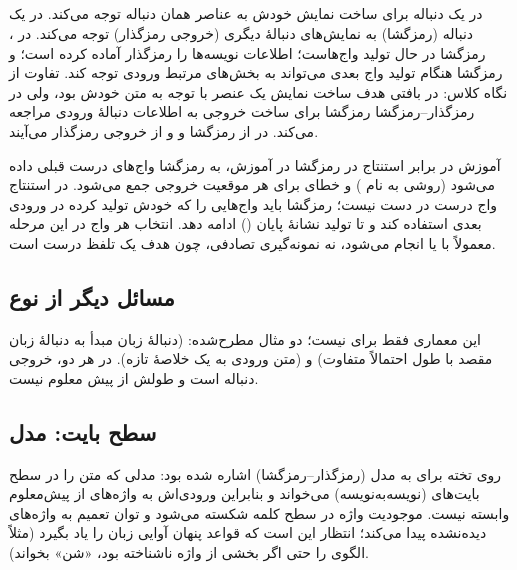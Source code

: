 \subsection{}
در  یک دنباله برای ساخت نمایش خودش به عناصر همان دنباله توجه می‌کند. در  یک دنباله (رمزگشا) به نمایش‌های دنبالهٔ دیگری (خروجی رمزگذار) توجه می‌کند. در ، رمزگشا در حال تولید واج‌هاست؛ اطلاعات نویسه‌ها را رمزگذار آماده کرده است؛ و رمزگشا هنگام تولید واج بعدی می‌تواند به بخش‌های مرتبط ورودی توجه کند. تفاوت از نگاه کلاس: در  بافتی هدف ساخت نمایش یک عنصر با توجه به متن خودش بود، ولی در رمزگذار–رمزگشا رمزگشا برای ساخت خروجی به اطلاعات دنبالهٔ ورودی مراجعه می‌کند. در   از رمزگشا و  و  از خروجی رمزگذار می‌آیند.

\begin{addedbox}{آموزش در برابر استنتاج در رمزگشا}
در آموزش، به رمزگشا واج‌های درست قبلی داده می‌شود (روشی به نام ) و خطای  برای هر موقعیت خروجی جمع می‌شود. در استنتاج واج درست در دست نیست؛ رمزگشا باید واج‌هایی را که خودش تولید کرده در ورودی بعدی استفاده کند و تا تولید نشانهٔ پایان () ادامه دهد. انتخاب هر واج در این مرحله معمولاً با  یا  انجام می‌شود، نه نمونه‌گیری تصادفی، چون هدف یک تلفظ درست است.
\end{addedbox}

\subsection{مسائل دیگر از نوع }
این معماری فقط برای  نیست؛ دو مثال مطرح‌شده:  (دنبالهٔ زبان مبدأ به دنبالهٔ زبان مقصد با طول احتمالاً متفاوت) و  (متن ورودی به یک خلاصهٔ تازه). در هر دو، خروجی دنباله است و طولش از پیش معلوم نیست.

\subsection{سطح بایت: مدل }
روی تخته برای  به مدل  (رمزگذار–رمزگشا) اشاره شده بود: مدلی که متن را در سطح بایت‌های  (نویسه‌به‌نویسه) می‌خواند و بنابراین ورودی‌اش به واژه‌های از پیش‌معلوم وابسته نیست. موجودیت واژه در سطح کلمه شکسته می‌شود و توان تعمیم به واژه‌های دیده‌نشده پیدا می‌کند؛ انتظار این است که قواعد پنهان آوایی زبان را یاد بگیرد (مثلاً الگوی  را حتی اگر بخشی از واژه ناشناخته بود، «شن» بخواند).

